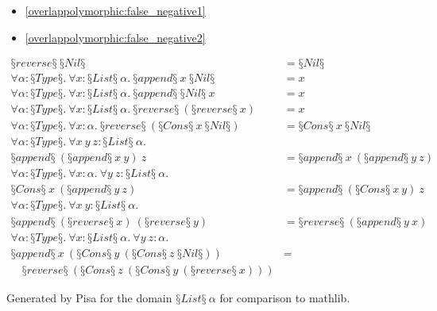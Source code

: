 \begin{multicols}{2}
\begin{itemize}[noitemsep]
    \item \cref{overlappolymorphic:false_negative1}
    \item \cref{overlappolymorphic:false_negative2}
\end{itemize}
\end{multicols}

\vspace{-0.7cm}
\begin{conjectureset}[H]
\begin{align}
§reverse§\ §Nil§ &= §Nil§ \label{overlappolymorphic:reverse_nil1}\\
\forall \alpha : §Type§.\ \forall x : §List§\ \alpha.\ §append§\ x\ §Nil§ &= x \label{overlappolymorphic:append_nil1}\\
\forall \alpha : §Type§.\ \forall x : §List§\ \alpha.\ §append§\ §Nil§\ x &= x \label{overlappolymorphic:nil_append1}\\
\forall \alpha : §Type§.\ \forall x : §List§\ \alpha.\ §reverse§\ (§reverse§\ x) &= x \label{overlappolymorphic:reverse_reverse1}\\
\forall \alpha : §Type§.\ \forall x : \alpha.\ §reverse§\ (§Cons§\ x\ §Nil§) &= §Cons§\ x\ §Nil§ \label{overlappolymorphic:false_positive1}\\
\forall \alpha : §Type§.\ \forall x\ y\ z : §List§\ \alpha.\ \nonumber \\
  §append§\ (§append§\ x\ y)\ z &= §append§\ x\ (§append§\ y\ z) \label{overlappolymorphic:append_assoc1}\\
\forall \alpha : §Type§.\ \forall x : \alpha.\ \forall y\ z : §List§\ \alpha.\ \nonumber \\
  §Cons§\ x\ (§append§\ y\ z) &= §append§\ (§Cons§\ x\ y)\ z\label{overlappolymorphic:cons_append1}\\
\forall \alpha : §Type§.\ \forall x\ y : §List§\ \alpha.\ \nonumber \\
  §append§\ (§reverse§\ x)\ (§reverse§\ y) &= §reverse§\ (§append§\ y\ x)\label{overlappolymorphic:reverse_append1}\\
\forall \alpha : §Type§.\ \forall x : §List§\ \alpha.\ \forall y\ z : \alpha.\ \nonumber \\
  §append§\ x\ (§Cons§\ y\ (§Cons§\ z\ §Nil§)) &= \nonumber \\
  \quad §reverse§\ (§Cons§\ z\ (§Cons§\ y\ (§reverse§\ x))) \label{overlappolymorphic:false_positive2}
\end{align}
\vspace{-0.9cm}
\caption{Generated by Pisa for the domain $§List§\ \alpha$ for comparison to mathlib.}\label{eqs:list:compare}
\end{conjectureset}


